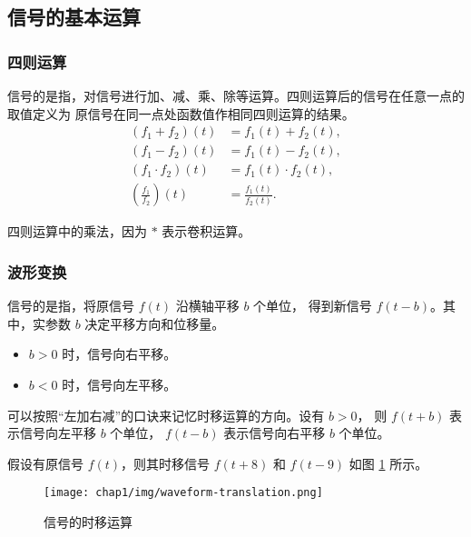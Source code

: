 \subsection{信号的基本运算}

\subsubsection{四则运算}

\begin{definition}
    信号的是指，对信号进行加、减、乘、除等运算。四则运算后的信号在任意一点的取值定义为
    原信号在同一点处函数值作相同四则运算的结果。
    \begin{align*}
        (f_1 + f_2)(t) & = f_1(t) + f_2(t), \\
        (f_1 - f_2)(t) & = f_1(t) - f_2(t), \\
        (f_1 \cdot f_2)(t) & = f_1(t) \cdot f_2(t), \\
        \left(\frac{f_1}{f_2}\right)(t) & = \frac{f_1(t)}{f_2(t)}.
    \end{align*}
\end{definition}

\begin{note}
    四则运算中的乘法，因为 $*$ 表示卷积运算。
\end{note}

\subsubsection{波形变换}

\begin{definition}[时移运算]
    信号的是指，将原信号 $f(t)$ 沿横轴平移 $b$ 个单位，
    得到新信号 $f(t - b)$。其中，实参数 $b$ 决定平移方向和位移量。
    \begin{itemize}
        \item $b > 0$ 时，信号向右平移。
        \item $b < 0$ 时，信号向左平移。
    \end{itemize}
\end{definition}

\begin{note}
    可以按照``左加右减''的口诀来记忆时移运算的方向。设有 $b > 0$，
    则 $f(t + b)$ 表示信号向左平移 $b$ 个单位，
    $f(t - b)$ 表示信号向右平移 $b$ 个单位。
\end{note}

\begin{example}
    假设有原信号 $f(t)$，则其时移信号 $f(t + 8)$ 和 $f(t - 9)$ 如图 \ref{fig:waveform-translation} 所示。
    \begin{figure}[H]
        \centering
        \texttt{[image: chap1/img/waveform-translation.png]}
        \caption{信号的时移运算}
        \label{fig:waveform-translation}
    \end{figure}
\end{example}

